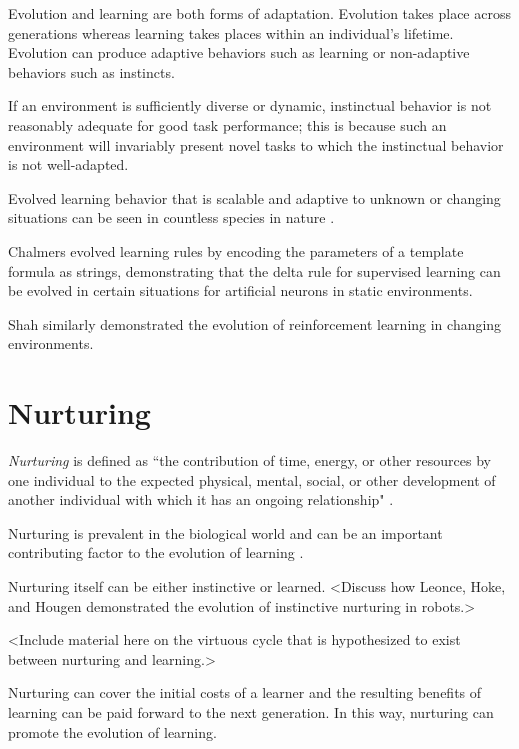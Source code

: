 \documentclass[master]{outhesis}
\begin{document}
Evolution and learning are both forms of adaptation.
Evolution takes place across generations whereas learning takes places within an individual's lifetime.
Evolution can produce adaptive behaviors such as learning or non-adaptive behaviors such as instincts.

If an environment is sufficiently diverse or dynamic, instinctual behavior is not reasonably adequate for good task performance;
this is because such an environment will invariably present novel tasks to which the instinctual behavior is not well-adapted.

Evolved learning behavior that is scalable and adaptive to unknown or changing situations can be seen in countless species in nature \cite{Shah:2015hs}.

Chalmers \cite{chalmers-evolution-learning} evolved learning rules by encoding the parameters of a template formula as strings, demonstrating that the delta rule for supervised learning can be evolved in certain situations for artificial neurons in static environments.


Shah \cite{Shah:2015hs} similarly demonstrated the evolution of reinforcement learning in changing environments.

\section{Nurturing}

\emph{Nurturing} is defined as ``the contribution of time, energy, or other resources by one individual to the expected physical, mental, social, or other development of another individual with which it has an ongoing relationship" \cite{nurturing-definition}.

Nurturing is prevalent in the biological world and can be an important contributing factor to the evolution of learning \cite{nurturing-definition} \cite{eskridge-learning-uncertain-environments}.

Nurturing itself can be either instinctive or learned. <Discuss how Leonce, Hoke, and Hougen demonstrated the evolution of instinctive nurturing in robots.>

<Include material here on the virtuous cycle that is hypothesized to exist between nurturing and learning.> 

Nurturing can cover the initial costs of a learner and the resulting benefits of learning can be paid forward to the next generation. In this way, nurturing can promote the evolution of learning.
\end{document}
